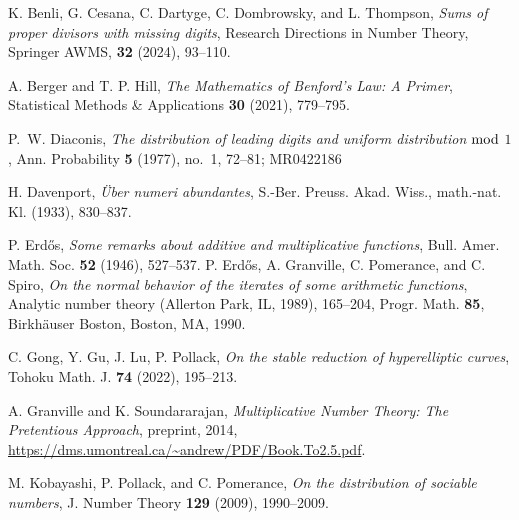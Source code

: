 \documentclass[11pt, reqno]{amsart}
\theoremstyle{remark}
\numberwithin{theorem}{section}
\numberwithin{proposition}{section}
\numberwithin{lemma}{section}
\numberwithin{corollary}{section}
\numberwithin{equation}{section}
\numberwithin{conjecture}{section}
\numberwithin{definition}{section}
\begin{document}
\begin{bibsection}
	\begin{biblist}


     K. Benli, G. Cesana, C. Dartyge, C. Dombrowsky, and L. Thompson, \emph{Sums of proper divisors with missing digits}, Research Directions in Number Theory, Springer AWMS, \textbf{32} (2024), 93--110.

    A. Berger and T. P. Hill, \emph{The Mathematics of Benford's Law: A Primer}, Statistical Methods \& Applications \textbf{30} (2021), 779--795.
     
    
    
   
    


 P.~W. Diaconis, \emph{ The distribution of leading digits and uniform distribution ${\rm mod}$ $1$}, Ann. Probability {\bf 5} (1977), no.~1, 72--81; MR0422186
    
  H. Davenport, \emph{\"{U}ber numeri abundantes}, S.-Ber. Preuss. Akad. Wiss., math.-nat. Kl. (1933),
830--837.
     
    P. Erd\H{o}s, \emph{Some remarks about additive and multiplicative functions}, Bull. Amer.
Math. Soc. {\bf 52} (1946), 527–537.
    P. Erd\H{o}s, A. Granville, C. Pomerance, and C. Spiro, \emph{On the normal behavior of the iterates of some arithmetic functions}, Analytic number theory (Allerton Park, IL, 1989), 165--204, Progr. Math. {\bf 85}, Birkhäuser Boston, Boston, MA, 1990.

   
    
    
     C. Gong, Y. Gu, J. Lu, P. Pollack, \emph{On the stable reduction of hyperelliptic curves}, Tohoku Math. J. \textbf{74} (2022), 195--213.


    A. Granville and K. Soundararajan, \emph{Multiplicative Number Theory: The Pretentious Approach}, preprint, 2014, \url{https://dms.umontreal.ca/~andrew/PDF/Book.To2.5.pdf}.
   
 



    
    
 M. Kobayashi, P. Pollack, and C. Pomerance, \emph{On the distribution of sociable numbers}, J. Number
Theory \textbf{129} (2009), 1990–2009.



   
    

\end{biblist}
\end{bibsection}
\end{document}
